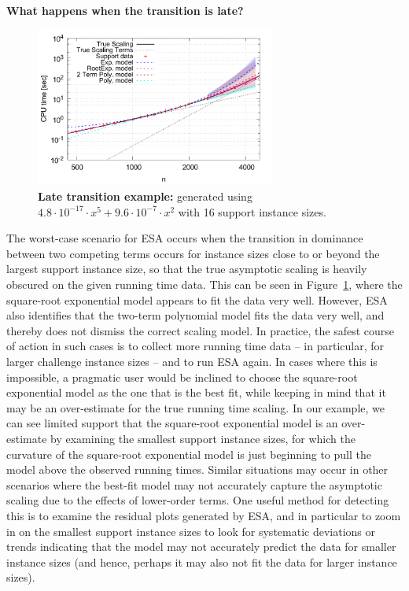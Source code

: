 \documentclass[aic]{iosart2x}
\begin{document}
\textbf{What happens when the transition is late?}
\begin{figure}[t]
\centering
\includegraphics[width=0.7\textwidth]{fittedModels-2-5-16-16s.pdf}
\caption{\textbf{Late transition example:} generated using $4.8\cdot 10^{-17} \cdot x^5 + 9.6\cdot 10^{-7} \cdot x^2$ with 16 support instance sizes.}
\label{fig:AA-competing-2-5-16-16s}
\end{figure}
The worst-case scenario for ESA occurs when the transition in dominance between two competing terms occurs for instance sizes close to or beyond the largest support instance size, so that the true asymptotic scaling is heavily obscured on the given running time data. 
This can be seen in Figure~\ref{fig:AA-competing-2-5-16-16s}, where the square-root exponential model appears to fit the data very well. 
However, ESA also identifies that the two-term polynomial model fits the data very well, and thereby does not dismiss the correct scaling model.
In practice, the safest course of action in such cases is to collect more running time data -- in particular, for larger challenge instance sizes -- and to run ESA again. 
In cases where this is impossible, a pragmatic user would be inclined to choose the square-root exponential model as the one that is the best fit, while keeping in mind that it may be an over-estimate for the true running time scaling. 
In our example, we can see limited support that the square-root exponential model is an over-estimate by examining the smallest support instance sizes, for which the curvature of the square-root exponential model is just beginning to pull the model above the observed running times.
Similar situations may occur in other scenarios where the best-fit model may not accurately capture the asymptotic scaling due to the effects of lower-order terms. One useful method for detecting this is to examine the residual plots generated by ESA, and in particular to zoom in on the smallest support instance sizes to look for systematic deviations or trends indicating that the model may not accurately predict the data for smaller instance sizes (and hence, perhaps it may also not fit the data for larger instance sizes).
\end{document}
